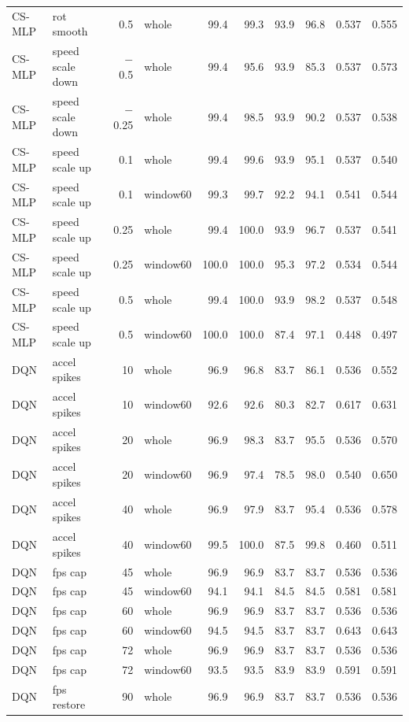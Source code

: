 \begin{longtable}{llrlrrrrrr}
CS-MLP & rot smooth & 0.5 & whole & 99.4 & 99.3 & 93.9 & 96.8 & 0.537 & 0.555 \\
CS-MLP & speed scale down & $-$0.5 & whole & 99.4 & 95.6 & 93.9 & 85.3 & 0.537 & 0.573 \\
CS-MLP & speed scale down & $-$0.25 & whole & 99.4 & 98.5 & 93.9 & 90.2 & 0.537 & 0.538 \\
CS-MLP & speed scale up & 0.1 & whole & 99.4 & 99.6 & 93.9 & 95.1 & 0.537 & 0.540 \\
CS-MLP & speed scale up & 0.1 & window60 & 99.3 & 99.7 & 92.2 & 94.1 & 0.541 & 0.544 \\
CS-MLP & speed scale up & 0.25 & whole & 99.4 & 100.0 & 93.9 & 96.7 & 0.537 & 0.541 \\
CS-MLP & speed scale up & 0.25 & window60 & 100.0 & 100.0 & 95.3 & 97.2 & 0.534 & 0.544 \\
CS-MLP & speed scale up & 0.5 & whole & 99.4 & 100.0 & 93.9 & 98.2 & 0.537 & 0.548 \\
CS-MLP & speed scale up & 0.5 & window60 & 100.0 & 100.0 & 87.4 & 97.1 & 0.448 & 0.497 \\
DQN & accel spikes & 10 & whole & 96.9 & 96.8 & 83.7 & 86.1 & 0.536 & 0.552 \\
DQN & accel spikes & 10 & window60 & 92.6 & 92.6 & 80.3 & 82.7 & 0.617 & 0.631 \\
DQN & accel spikes & 20 & whole & 96.9 & 98.3 & 83.7 & 95.5 & 0.536 & 0.570 \\
DQN & accel spikes & 20 & window60 & 96.9 & 97.4 & 78.5 & 98.0 & 0.540 & 0.650 \\
DQN & accel spikes & 40 & whole & 96.9 & 97.9 & 83.7 & 95.4 & 0.536 & 0.578 \\
DQN & accel spikes & 40 & window60 & 99.5 & 100.0 & 87.5 & 99.8 & 0.460 & 0.511 \\
DQN & fps cap & 45 & whole & 96.9 & 96.9 & 83.7 & 83.7 & 0.536 & 0.536 \\
DQN & fps cap & 45 & window60 & 94.1 & 94.1 & 84.5 & 84.5 & 0.581 & 0.581 \\
DQN & fps cap & 60 & whole & 96.9 & 96.9 & 83.7 & 83.7 & 0.536 & 0.536 \\
DQN & fps cap & 60 & window60 & 94.5 & 94.5 & 83.7 & 83.7 & 0.643 & 0.643 \\
DQN & fps cap & 72 & whole & 96.9 & 96.9 & 83.7 & 83.7 & 0.536 & 0.536 \\
DQN & fps cap & 72 & window60 & 93.5 & 93.5 & 83.9 & 83.9 & 0.591 & 0.591 \\
DQN & fps restore & 90 & whole & 96.9 & 96.9 & 83.7 & 83.7 & 0.536 & 0.536 \\

\end{longtable}
